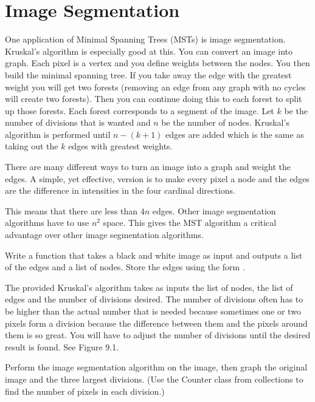 
\section*{Image Segmentation}


One application of Minimal Spanning Trees (MSTs) is image segmentation.
Kruskal's algorithm is especially good at this.
You can convert an image into graph. Each pixel is a vertex and you define weights between the nodes. You then build the minimal spanning tree. If you take away the edge with the greatest weight you will get two forests (removing an edge from any graph with no cycles will create two forests). Then you can continue doing this to each forest to split up those forests. Each forest corresponds to a segment of the image.
Let $k$ be the number of divisions that is wanted and $n$ be the number of nodes.
Kruskal's algorithm is performed until $n-(k+1)$ edges are added which is the same as taking out the $k$ edges with greatest weights.

There are many different ways to turn an image into a graph and weight the edges.
A simple, yet effective, version is to make every pixel a node and the edges are the difference in intensities in the four cardinal directions.


This means that there are less than $4n$ edges.
Other image segmentation algorithms have to use $n^2$ space.
This gives the MST algorithm a critical advantage over other image segmentation algorithms.

\begin{problem}
Write a function that takes a black and white image as input and outputs a list of the edges and a list of nodes.
Store the edges using the form .
\end{problem}

The provided Kruskal's algorithm takes as inputs the list of nodes, the list of edges and the number of divisions desired.
The number of divisions often has to be higher than the actual number that is needed because sometimes one or two pixels form a division because the difference between them and the pixels around them is so great.
You will have to adjust the number of divisions until the desired result is found.  See Figure 9.1.

\begin{problem}
Perform the image segmentation algorithm on the image, then graph the original image and the three largest divisions.
(Use the Counter class from collections to find the number of pixels in each division.)
\end{problem}

